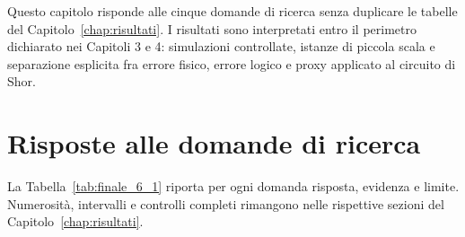 
Questo capitolo risponde alle cinque domande di ricerca senza duplicare le tabelle del Capitolo~\ref{chap:risultati}. I risultati sono interpretati entro il perimetro dichiarato nei Capitoli 3 e 4: simulazioni controllate, istanze di piccola scala e separazione esplicita fra errore fisico, errore logico e proxy applicato al circuito di Shor.

\section{Risposte alle domande di ricerca}\label{sec:finale_6_1}

La Tabella~\ref{tab:finale_6_1} riporta per ogni domanda risposta, evidenza e limite. Numerosità, intervalli e controlli completi rimangono nelle rispettive sezioni del Capitolo~\ref{chap:risultati}.

